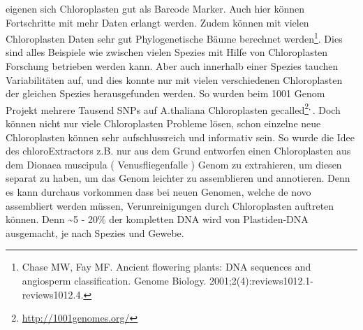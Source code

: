 \documentclass{scrartcl}
\begin{document}
eigenen sich Chloroplasten gut als Barcode Marker. Auch hier können Fortschritte mit mehr Daten erlangt werden. Zudem können mit vielen Chloroplasten Daten sehr gut Phylogenetische Bäume berechnet werden\footnote{Chase MW, Fay MF. Ancient flowering plants: DNA sequences and angiosperm classification. Genome Biology. 2001;2(4):reviews1012.1-reviews1012.4.}.
Dies sind alles Beispiele wie zwischen vielen Spezies mit Hilfe von Chloroplasten Forschung betrieben werden kann. Aber auch innerhalb einer Spezies tauchen Variabilitäten auf, und dies konnte nur mit vielen verschiedenen
Chloroplasten der gleichen Spezies herausgefunden werden. So wurden beim 1001 Genom Projekt mehrere Tausend SNPs auf A.thaliana Chloroplasten gecalled\footnote{\url{http://1001genomes.org/}}\textsuperscript{,}\,\footnotemark[7]{}. 
Doch können nicht nur viele Chloroplasten Probleme lösen, schon einzelne neue Chloroplasten können sehr aufschlussreich und informativ sein. So wurde die Idee des chloroExtractors z.B. nur aus dem Grund
entworfen einen Chloroplasten aus dem Dionaea muscipula ( Venusfliegenfalle ) Genom zu extrahieren, um diesen separat zu haben, um das Genom leichter zu assemblieren und annotieren. Denn es kann durchaus vorkommen
dass bei neuen Genomen, welche de novo assembliert werden müssen, Verunreinigungen durch Chloroplasten auftreten können. Denn \textasciitilde{}5 - 20\% der kompletten DNA wird von Plastiden-DNA ausgemacht, je nach Spezies und Gewebe\footnotemark[33]{}.
\end{document}
